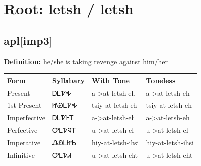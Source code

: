 \documentclass{article}%
\begin{document}
%
\normalsize%
\section*{Root: letsh / letsh}%
\subsection*{apl[imp3]}%
\textbf{Definition: }%
he/she is taking revenge against him/her%
\\[0.5em]%
\begin{tabular}{|l|l|l|l|}%
\hline%
\textbf{Form}&\textbf{Syllabary}&\textbf{With Tone}&\textbf{Toneless}\\%
\hline%
Present&ᎠᏞᏤᎭ&a{-}>at{-}letsh{-}eh&a{-}>at{-}letsh{-}eh\\%
1st Present&ᏥᏯᏞᏤᎭ&tsiy{-}at{-}letsh{-}eh&tsiy{-}at{-}letsh{-}eh\\%
Imperfective&ᎠᏞᏤᎰᎢ&a{-}>at{-}letsh{-}eh&a{-}>at{-}letsh{-}eh\\%
Perfective&ᎤᏞᏤᎸᎢ&u{-}>at{-}letsh{-}el&u{-}>at{-}letsh{-}el\\%
Imperative&ᎯᏯᏞᏥᏏ&hiy{-}at{-}letsh{-}ihsi&hiy{-}at{-}letsh{-}ihsi\\%
Infinitive&ᎤᏞᏤᏗ&u{-}>at{-}letsh{-}eht&u{-}>at{-}letsh{-}eht\\%
\hline%
\end{tabular}%
\\[1em]%
\end{document}
